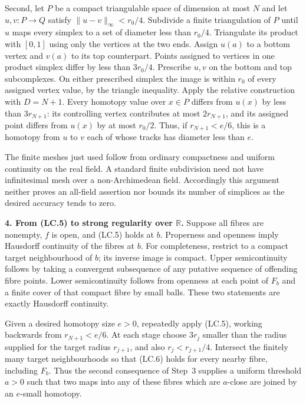 Second, let $P$ be a compact triangulable space of dimension at most $N$
and let $u,v:P\to Q$ satisfy $\|u-v\|_\infty<r_0/4$. Subdivide a
finite triangulation of $P$ until $u$ maps every simplex to a set of
diameter less than $r_0/4$. Triangulate its product with $[0,1]$ using
only the vertices at the two ends. Assign $u(a)$ to a bottom vertex
and $v(a)$ to its top counterpart. Points assigned to vertices in one
product simplex differ by less than $3r_0/4$. Prescribe $u,v$ on the
bottom and top subcomplexes. On either prescribed simplex the image is
within $r_0$ of every assigned vertex value, by the triangle inequality.
Apply the relative construction with $D=N+1$. Every homotopy value over
$x\in P$ differs from $u(x)$ by less than $3r_{N+1}$: its controlling
vertex contributes at most $2r_{N+1}$, and its assigned point differs
from $u(x)$ by at most $r_0/2$. Thus, if $r_{N+1}<e/6$, this is a
homotopy from $u$ to $v$ each of whose tracks has diameter less than $e$.

The finite meshes just used follow from ordinary compactness and uniform
continuity on the real field. A standard finite subdivision need not have
infinitesimal mesh over a non-Archimedean field. Accordingly this argument
neither proves an all-field assertion nor bounds its number of simplices
as the desired accuracy tends to zero.

\textbf{4. From (LC.5) to strong regularity over $\mathbb R$.}
Suppose all fibres are nonempty, $f$ is open, and (LC.5) holds at $b$.
Properness and openness imply Hausdorff continuity of the fibres at $b$.
For completeness, restrict to a compact target neighbourhood of $b$;
its inverse image is compact. Upper semicontinuity follows by taking a
convergent subsequence of any putative sequence of offending fibre
points. Lower semicontinuity follows from openness at each point of
$F_b$ and a finite cover of that compact fibre by small balls. These two
statements are exactly Hausdorff continuity.

Given a desired homotopy size $e>0$, repeatedly apply (LC.5), working
backwards from $r_{N+1}<e/6$. At each stage choose
$3r_j$ smaller than the radius supplied for the target radius
$r_{j+1}$, and also $r_j<r_{j+1}/4$. Intersect the finitely many target
neighbourhoods so that (LC.6) holds for every nearby fibre, including
$F_b$. Thus the second consequence of Step~3 supplies a uniform
threshold $a>0$ such that two maps into any of these fibres which are
$a$-close are joined by an $e$-small homotopy.

